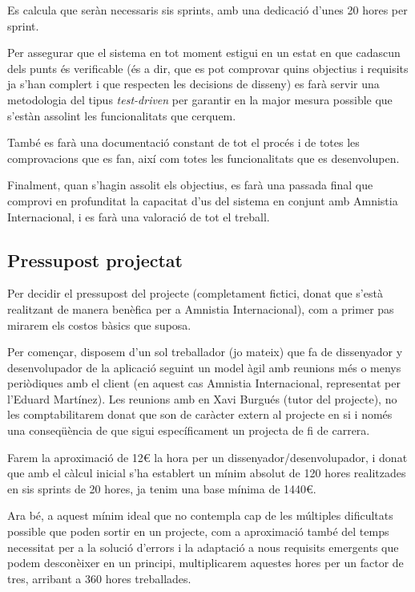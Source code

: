 \documentclass{article}
\begin{document}
Es calcula que seràn necessaris sis sprints, amb una dedicació d'unes 20 hores per sprint.

Per assegurar que el sistema en tot moment estigui en un estat en que cadascun dels punts és verificable (és a dir, que es pot comprovar quins objectius i requisits ja s'han complert i que respecten les decisions de disseny) es farà servir una metodologia del tipus \emph{test-driven} per garantir en la major mesura possible que s'estàn assolint les funcionalitats que cerquem.

També es farà una documentació constant de tot el procés i de totes les comprovacions que es fan, així com totes les funcionalitats que es desenvolupen.

Finalment, quan s'hagin assolit els objectius, es farà una passada final que comprovi en profunditat la capacitat d'us del sistema en conjunt amb Amnistia Internacional, i es farà una valoració de tot el treball.

\newpage

\subsection{Pressupost projectat}

Per decidir el pressupost del projecte (completament fictici, donat que s'està realitzant de manera benèfica per a Amnistia Internacional), com a primer pas mirarem els costos bàsics que suposa.

Per començar, disposem d'un sol treballador (jo mateix) que fa de dissenyador y desenvolupador de la aplicació seguint un model àgil amb reunions més o menys periòdiques amb el client (en aquest cas Amnistia Internacional, representat per l'Eduard Martínez). Les reunions amb en Xavi Burgués (tutor del projecte), no les comptabilitarem donat que son de caràcter extern al projecte en si i només una conseqüència de que sigui específicament un projecta de fi de carrera.

Farem la aproximació de 12€ la hora per un dissenyador/desenvolupador, i donat que amb el càlcul inicial s'ha establert un mínim absolut de 120 hores realitzades en sis sprints de 20 hores, ja tenim una base mínima de 1440€.

Ara bé, a aquest mínim ideal que no contempla cap de les múltiples dificultats possible que poden sortir en un projecte, com a aproximació també del temps necessitat per a la solució d'errors i la adaptació a nous requisits emergents que podem desconèixer en un principi, multiplicarem aquestes hores per un factor de tres, arribant a 360 hores treballades.
\end{document}
